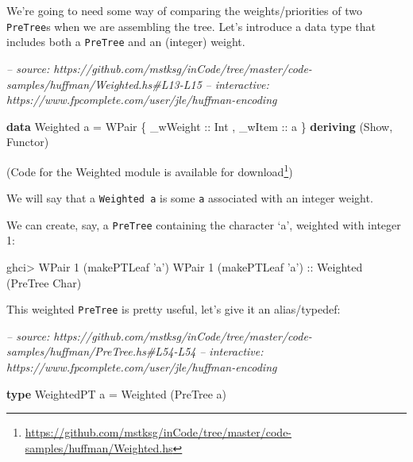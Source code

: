 \documentclass[]{article}
\newenvironment{Shaded}{}{}
\newcommand{\CharTok}[1]{\textcolor[rgb]{0.25,0.44,0.63}{#1}}
\newcommand{\CommentTok}[1]{\textcolor[rgb]{0.38,0.63,0.69}{\textit{#1}}}
\newcommand{\DataTypeTok}[1]{\textcolor[rgb]{0.56,0.13,0.00}{#1}}
\newcommand{\DecValTok}[1]{\textcolor[rgb]{0.25,0.63,0.44}{#1}}
\newcommand{\FunctionTok}[1]{\textcolor[rgb]{0.02,0.16,0.49}{#1}}
\newcommand{\KeywordTok}[1]{\textcolor[rgb]{0.00,0.44,0.13}{\textbf{#1}}}
\newcommand{\NormalTok}[1]{#1}
\newcommand{\OtherTok}[1]{\textcolor[rgb]{0.00,0.44,0.13}{#1}}
\renewcommand{\href}[2]{#2\footnote{\url{#1}}}
\begin{document}
We're going to need some way of comparing the weights/priorities of two
\texttt{PreTree}s when we are assembling the tree. Let's introduce a data type
that includes both a \texttt{PreTree} and an (integer) weight.

\begin{Shaded}
\begin{Highlighting}[]
\CommentTok{-- source: https://github.com/mstksg/inCode/tree/master/code-samples/huffman/Weighted.hs#L13-L15}
\CommentTok{-- interactive: https://www.fpcomplete.com/user/jle/huffman-encoding}

\KeywordTok{data} \DataTypeTok{Weighted}\NormalTok{ a }\FunctionTok{=} \DataTypeTok{WPair}\NormalTok{ \{}\OtherTok{ _wWeight ::} \DataTypeTok{Int}
\NormalTok{                        ,}\OtherTok{ _wItem   ::}\NormalTok{ a}
\NormalTok{                        \} }\KeywordTok{deriving}\NormalTok{ (}\DataTypeTok{Show}\NormalTok{, }\DataTypeTok{Functor}\NormalTok{)}
\end{Highlighting}
\end{Shaded}

(Code for the Weighted module is
\href{https://github.com/mstksg/inCode/tree/master/code-samples/huffman/Weighted.hs}{available
for download})

We will say that a \texttt{Weighted\ a} is some \texttt{a} associated with an
integer weight.

We can create, say, a \texttt{PreTree} containing the character `a', weighted
with integer 1:

\begin{Shaded}
\begin{Highlighting}[]
\NormalTok{ghci}\FunctionTok{>} \DataTypeTok{WPair} \DecValTok{1}\NormalTok{ (makePTLeaf }\CharTok{'a'}\NormalTok{)}
\DataTypeTok{WPair} \DecValTok{1}\NormalTok{ (makePTLeaf }\CharTok{'a'}\NormalTok{)}\OtherTok{ ::} \DataTypeTok{Weighted}\NormalTok{ (}\DataTypeTok{PreTree} \DataTypeTok{Char}\NormalTok{)}
\end{Highlighting}
\end{Shaded}

This weighted \texttt{PreTree} is pretty useful, let's give it an alias/typedef:

\begin{Shaded}
\begin{Highlighting}[]
\CommentTok{-- source: https://github.com/mstksg/inCode/tree/master/code-samples/huffman/PreTree.hs#L54-L54}
\CommentTok{-- interactive: https://www.fpcomplete.com/user/jle/huffman-encoding}

\KeywordTok{type} \DataTypeTok{WeightedPT}\NormalTok{ a }\FunctionTok{=} \DataTypeTok{Weighted}\NormalTok{ (}\DataTypeTok{PreTree}\NormalTok{ a)}
\end{Highlighting}
\end{Shaded}
\end{document}
